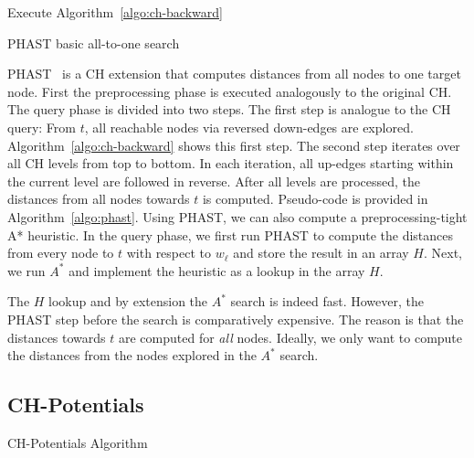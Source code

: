 \documentclass[a4paper,USenglish,cleveref, autoref, thm-restate]{lipics-v2019}
\begin{document}
\begin{algorithm2e}
Execute Algorithm~\ref{algo:ch-backward}\;
\caption{PHAST basic all-to-one search}
\label{algo:phast}
\end{algorithm2e}

PHAST~\cite{dgnw-phast-13} is a CH extension that computes distances from all nodes to one target node.
First the preprocessing phase is executed analogously to the original CH.
The query phase is divided into two steps.
The first step is analogue to the CH query:
From $t$, all reachable nodes via reversed down-edges are explored.
Algorithm~\ref{algo:ch-backward} shows this first step.
The second step iterates over all CH levels from top to bottom.
In each iteration, all up-edges starting within the current level are followed in reverse.
After all levels are processed, the distances from all nodes towards $t$ is computed.
Pseudo-code is provided in Algorithm~\ref{algo:phast}.
Using PHAST, we can also compute a preprocessing-tight A* heuristic.
In the query phase, we first run PHAST to compute the distances from every node to $t$ with respect to $w_\ell$ and store the result in an array $H$.
Next, we run $A^*$ and implement the heuristic as a lookup in the array $H$.

The $H$ lookup and by extension the $A^*$ search is indeed fast.
However, the PHAST step before the search is comparatively expensive.
The reason is that the distances towards $t$ are computed for \emph{all} nodes.
Ideally, we only want to compute the distances from the nodes explored in the $A^*$ search.

\subsection{CH-Potentials}

\begin{algorithm2e}
\caption{CH-Potentials Algorithm}
\label{algo:pot}
\end{algorithm2e}
\end{document}
